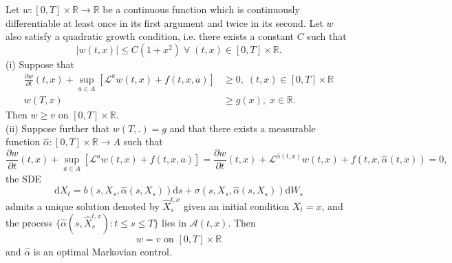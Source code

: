\begin{theorem}
    Let $w:[0,T]\times\mathbb{R}\rightarrow\mathbb{R}$ be a continuous function which
    is continuously differentiable at least once in its first argument and twice
    in its second. Let $w$ also satisfy a quadratic growth condition, i.e. there
    exists a constant $C$ such that
    \begin{equation*}
        |w(t,x)|\leq C(1+x^2)\;\forall\;(t,x)\in[0,T]\times\mathbb{R}.
    \end{equation*}
    (i) Suppose that
    \begin{align}
        \frac{\partial w}{\partial t}(t,x)+\sup_{a\in A}[\mathcal{L}^aw(t,x)+f(t,x,a)]&\geq0,\;(t,x)\in[0,T]\times\mathbb{R}\label{eq:A.1}\\
        w(T,x)&\geq g(x),\;x\in\mathbb{R}.\label{eq:A.2}
    \end{align}
    Then $w\geq v$ on $[0,T]\times\mathbb{R}.$\\
    (ii) Suppose further that $w(T,.)=g$ and that there exists a measurable function
    $\hat{\alpha}:[0,T]\times\mathbb{R}\rightarrow A$ such that
    \begin{equation*}
        \frac{\partial w}{\partial t}(t,x)+\sup_{a\in A}[\mathcal{L}^aw(t,x)+f(t,x,a)]=\frac{\partial w}{\partial t}(t,x)+\mathcal{L}^{\hat{\alpha}(t,x)}w(t,x)+f(t,x,\hat{\alpha}(t,x))=0,
    \end{equation*}
    the SDE
    \begin{equation*}
        \mathrm dX_t=b(s,X_s,\hat{\alpha}(s,X_s))\mathrm ds+\sigma(s,X_s,\hat{\alpha}(s,X_s))\mathrm dW_s
    \end{equation*}
    admits a unique solution denoted by $\hat{X}_s^{t,x}$ given an initial condition
    $X_t=x$, and the process $\{\hat{\alpha}(s,\hat{X}_s^{t,x}):t\leq s\leq T\}$
    lies in $\mathcal{A}(t,x)$. Then
    \begin{equation}
        w=v\textrm{ on }[0,T]\times\mathbb{R}
    \end{equation}
    and $\hat{\alpha}$ is an optimal Markovian control.
\end{theorem}
